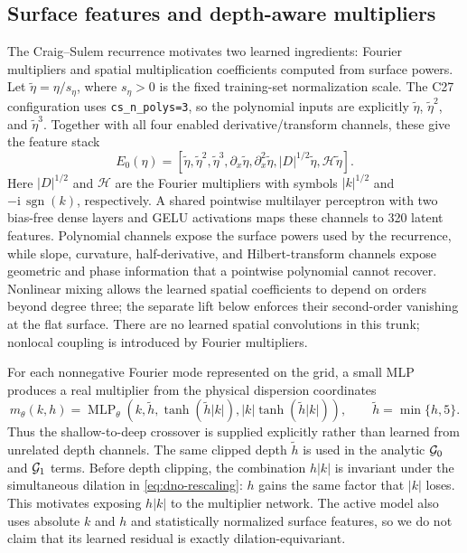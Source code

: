 \subsection{Surface features and depth-aware multipliers}

The Craig--Sulem recurrence motivates two learned ingredients: Fourier
multipliers and spatial multiplication coefficients computed from surface
powers.
Let $\widetilde\eta=\eta/s_\eta$, where $s_\eta>0$ is the fixed training-set
normalization scale. The C27 configuration uses \texttt{cs\_n\_polys=3}, so
the polynomial inputs are explicitly $\widetilde\eta$,
$\widetilde\eta^2$, and $\widetilde\eta^3$. Together with all four enabled
derivative/transform channels, these give the feature stack
\begin{equation}
  E_0(\eta)=
  \left[\widetilde\eta,\widetilde\eta^2,\widetilde\eta^3,
  \partial_x\widetilde\eta,\partial_x^2\widetilde\eta,
  |D|^{1/2}\widetilde\eta,\mathcal H\widetilde\eta\right].
  \label{eq:eta-features}
\end{equation}
Here $|D|^{1/2}$ and $\mathcal H$ are the Fourier multipliers with symbols
$|k|^{1/2}$ and $-\mathrm i\,\operatorname{sgn}(k)$, respectively.
A shared pointwise multilayer perceptron with two bias-free dense layers and
GELU activations maps these channels to 320 latent features.
Polynomial channels expose the surface powers used by the recurrence, while
slope, curvature, half-derivative, and Hilbert-transform channels expose
geometric and phase information that a pointwise polynomial cannot recover.
Nonlinear mixing allows the learned spatial coefficients to depend on orders
beyond degree three; the separate lift below enforces their second-order
vanishing at the flat surface.
There are no learned spatial convolutions in this trunk; nonlocal coupling is
introduced by Fourier multipliers.

For each nonnegative Fourier mode represented on the grid, a small MLP
produces a real multiplier from the physical dispersion coordinates
\begin{equation}
  m_\theta(k,h)
  =\operatorname{MLP}_\theta
  \left(k,\widetilde h,\tanh(\widetilde h|k|),
  |k|\tanh(\widetilde h|k|)\right),
  \qquad \widetilde h=\min\{h,5\}.
  \label{eq:depth-multiplier}
\end{equation}
Thus the shallow-to-deep crossover is supplied explicitly rather than learned
from unrelated depth channels.  The same clipped depth $\widetilde h$ is used
in the analytic $\mathcal{G}_0$ and $\mathcal{G}_1$ terms.
Before depth clipping, the combination $h|k|$ is invariant under the
simultaneous dilation in \eqref{eq:dno-rescaling}: $h$ gains the same factor
that $|k|$ loses.  This motivates exposing $h|k|$ to the multiplier network.
The active model also
uses absolute $k$ and $h$ and statistically normalized surface features, so we
do not claim that its learned residual is exactly dilation-equivariant.


